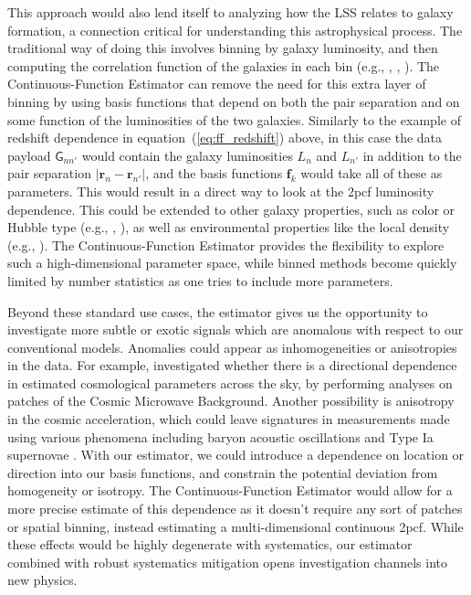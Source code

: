 \documentclass[modern]{aastex62}
\newcommand{\cf}{2pcf\xspace} %
\newcommand{\Est}{The Continuous-Function Estimator\xspace}
\newcommand{\eqt}[1]{equation~(\ref{#1})}
\newcommand{\bld}[1]{\bm{#1}} %
\newcommand{\ff}{\bld{f}}
\newcommand{\GG}[1]{\mathsf{G}_{#1}}
\begin{document}
This approach would also lend itself to analyzing how the LSS relates to galaxy formation, a connection critical for understanding this astrophysical process.
The traditional way of doing this involves binning by galaxy luminosity, and then computing the correlation function of the galaxies in each bin (e.g., \citealt{Budavari2003}, \citealt{Zehavi2011}, \citealt{Durkalec2018}).
\Est can remove the need for this extra layer of binning by using basis functions that depend on both the pair separation and on some function of the luminosities of the two galaxies.
Similarly to the example of redshift dependence in \eqt{eq:ff_redshift} above, in this case the data payload $\GG{n n'}$ would contain the galaxy luminosities $L_n$ and $L_{n'}$ in addition to the pair separation $|\bld{r}_n - \bld{r}_{n'}|$, and the basis functions $\ff_k$ would take all of these as parameters.
This would result in a direct way to look at the \cf luminosity dependence.
This could be extended to other galaxy properties, such as color or Hubble type (e.g., \citealt{Li2006}, \citealt{Skibba2014}), as well as environmental properties like the local density (e.g., \citealt{Abbas2006}).
\Est provides the flexibility to explore such a high-dimensional parameter space, while binned methods become quickly limited by number statistics as one tries to include more parameters.

Beyond these standard use cases, the estimator gives us the opportunity to investigate more subtle or exotic signals which are anomalous with respect to our conventional models.
Anomalies could appear as inhomogeneities or anisotropies in the data.
For example, \cite{MukherjeeWandelt2018} investigated whether there is a directional dependence in estimated cosmological parameters across the sky, by performing analyses on patches of the Cosmic Microwave Background.
Another possibility is anisotropy in the cosmic acceleration, which could leave signatures in measurements made using various phenomena including baryon acoustic oscillations \citep{Faltenbacher2012} and Type Ia supernovae \citep{Colin2019}.
With our estimator, we could introduce a dependence on location or direction into our basis functions, and constrain the potential deviation from homogeneity or isotropy.
\Est would allow for a more precise estimate of this dependence as it doesn't require any sort of patches or spatial binning, instead estimating a multi-dimensional continuous \cf.
While these effects would be highly degenerate with systematics, our estimator combined with robust systematics mitigation opens investigation channels into new physics.
\end{document}
